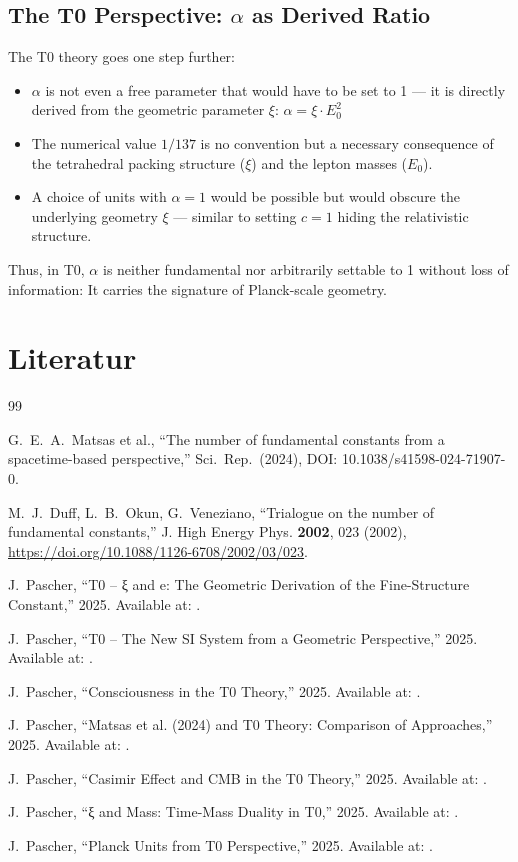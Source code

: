 	\subsection{The T0 Perspective: $\alpha$ as Derived Ratio}
	The T0 theory goes one step further:
	\begin{itemize}
		\item $\alpha$ is not even a free parameter that would have to be set to 1 --- it is directly derived from the geometric parameter $\xi$:
		$\alpha = \xi \cdot E_0^2$
		\item The numerical value $1/137$ is no convention but a necessary consequence of the tetrahedral packing structure ($\xi$) and the lepton masses ($E_0$).
		\item A choice of units with $\alpha = 1$ would be possible but would obscure the underlying geometry $\xi$ --- similar to setting $c = 1$ hiding the relativistic structure.
	\end{itemize}
	
	Thus, in T0, $\alpha$ is neither fundamental nor arbitrarily settable to 1 without loss of information: It carries the signature of Planck-scale geometry.
	
\section{Literatur}

\begin{thebibliography}{99}
	
	G.~E.~A.~Matsas et al.,
	``The number of fundamental constants from a spacetime-based perspective,''
	Sci.\ Rep.\ (2024), DOI: 10.1038/s41598-024-71907-0.
	
	M.~J.~Duff, L.~B.~Okun, G.~Veneziano,
	``Trialogue on the number of fundamental constants,''
	J. High Energy Phys. \textbf{2002}, 023 (2002),
	\url{https://doi.org/10.1088/1126-6708/2002/03/023}.
	
	J.~Pascher,
	``T0 – ξ and e: The Geometric Derivation of the Fine-Structure Constant,''
	2025.
	Available at:
	.
	
	J.~Pascher,
	``T0 – The New SI System from a Geometric Perspective,''
	2025.
	Available at:
	.
	
	J.~Pascher,
	``Consciousness in the T0 Theory,''
	2025.
	Available at:
	.
	
	J.~Pascher,
	``Matsas et al. (2024) and T0 Theory: Comparison of Approaches,''
	2025.
	Available at:
	.
	
	J.~Pascher,
	``Casimir Effect and CMB in the T0 Theory,''
	2025.
	Available at:
	.
	
	J.~Pascher,
	``ξ and Mass: Time-Mass Duality in T0,''
	2025.
	Available at:
	.
	
	J.~Pascher,
	``Planck Units from T0 Perspective,''
	2025.
	Available at:
	.
	
\end{thebibliography}
